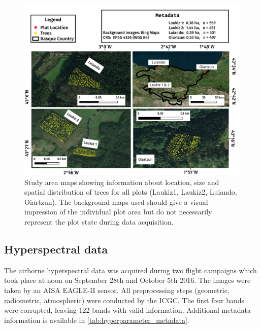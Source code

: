 \documentclass[final]{IEEEtran}
\begin{document}
\begin{figure} [ht!]
	\begin{center}
		\centering
		\includegraphics[width=\textwidth] {study-area-hyperspectral.pdf}
		\caption{Study area maps showing information about location, size and spatial distribution of trees for all plots (Laukiz1, Laukiz2, Luiando, Oiartzun). The background maps used should give a visual impression of the individual plot area but do not necessarily represent the plot state during data acquisition.}\label{fig:study_area}
	\end{center}
\end{figure}


\subsection{Hyperspectral data}

The airborne hyperspectral data was acquired during two flight campaigns which took place at noon on September 28th and October 5th 2016.
The images were taken by an AISA EAGLE-II sensor.
All preprocessing steps (geometric, radiometric, atmospheric) were conducted by the \ac{ICGC}.
The first four bands were corrupted, leaving 122 bands with valid information.
Additional metadata information is available in \autoref{tab:hyperparameter_metadata}.
\end{document}
